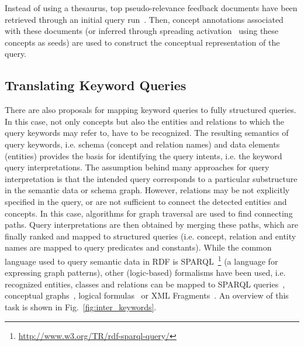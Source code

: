 Instead of using a thesaurus, top pseudo-relevance feedback documents have been retrieved through an initial query run~\cite{DBLP:journals/ipm/MeijTRK10}. Then, concept annotations associated with these documents (or inferred through spreading activation~\cite{DBLP:conf/aaai/JiangT06} using these concepts as seeds) are used to construct the conceptual representation of the query. 
	
\subsection{Translating Keyword Queries} 
There are also proposals for mapping keyword queries to fully structured queries. In this case, not only concepts but also the entities and relations to which the query keywords may refer to, have to be recognized. The resulting semantics of query keywords, i.e. schema (concept and relation names) and data elements (entities) provides the basis for identifying the query intents, i.e. the keyword query interpretations. The assumption behind many approaches for query interpretation is that the intended query corresponds to a particular substructure in the semantic data or schema graph. However, relations may be not explicitly specified in the query, or are not sufficient to connect the detected entities and concepts. In this case, algorithms for graph traversal are used to find connecting paths. Query interpretations are then obtained by merging these paths, which are finally ranked and mapped to structured queries (i.e. concept, relation and entity names are mapped to query predicates and constants). While the common language used to query semantic data in RDF is SPARQL~\footnote{\url{http://www.w3.org/TR/rdf-sparql-query/}} (a language for expressing graph patterns), other (logic-based) formalisms have been used, i.e. recognized entities, classes and relations can be mapped to SPARQL queries~\cite{DBLP:conf/esws/DamljanovicAC10}, 
conceptual graphs~\cite{DBLP:conf/aswc/CaoCT08}, logical formulas~\cite{DBLP:journals/dke/CimianoHHMS08} or XML Fragments~\cite{DBLP:conf/sigir/Chu-CarrollPCFD06}. An overview of this task is shown in Fig.~\ref{fig:inter_keywords}.

